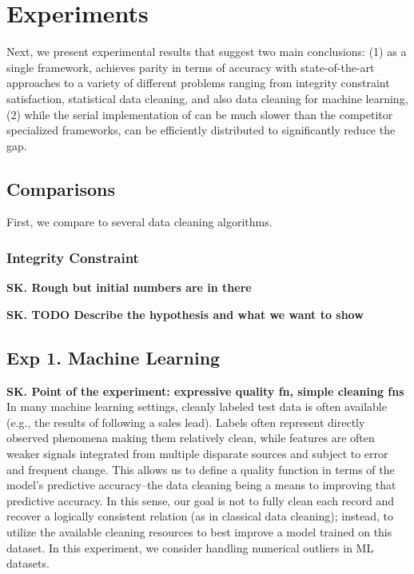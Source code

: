 \section{Experiments}\label{s:exp}
Next, we present experimental results that suggest two main conclusions: (1) as a single framework, \sys achieves parity in terms of accuracy with state-of-the-art approaches to a variety of different problems ranging from integrity constraint satisfaction, statistical data cleaning, and also data cleaning for machine learning, (2) while the serial implementation of \sys can be much slower than the competitor specialized frameworks, \sys can be efficiently distributed to significantly reduce the gap.

\subsection{Comparisons}
First, we compare \sys to several data cleaning algorithms. 

\subsubsection{Integrity Constraint}




\textbf{SK. Rough but initial numbers are in there}

\textbf{SK. TODO Describe the hypothesis and what we want to show}


\subsection*{Exp 1. Machine Learning}
\textbf{SK. Point of the experiment: expressive quality fn, simple cleaning fns}
In many machine learning settings, cleanly labeled test data is often available (e.g., the results of following a sales lead). 
Labels often represent directly observed phenomena making them relatively clean, while features are often weaker signals integrated from multiple disparate sources and subject to error and frequent change.
This allows us to define a quality function in terms of the model's predictive accuracy--the data cleaning being a means to improving that predictive accuracy.
In this sense, our goal is not to fully clean each record and recover a logically consistent relation (as in classical data cleaning); instead, to utilize the available cleaning resources to best improve a model trained on this dataset. In this experiment, we consider handling numerical outliers in ML datasets.

